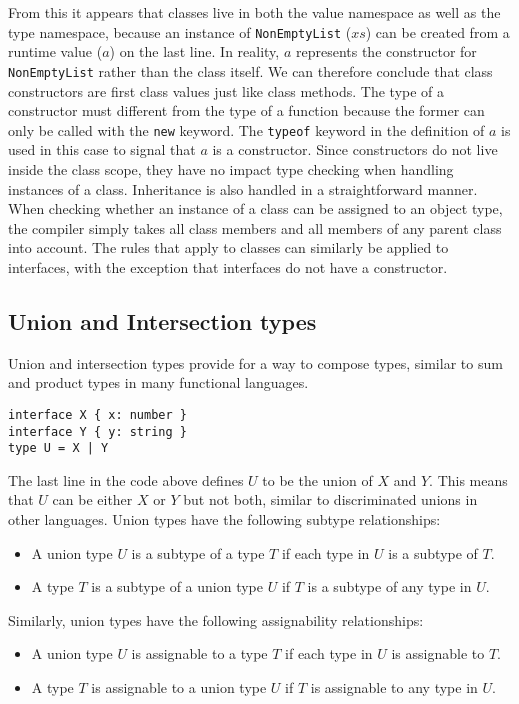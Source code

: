 From this it appears that classes live in both the value namespace as well as the type namespace,
because an instance of \texttt{NonEmptyList} ($xs$) can be created from a runtime value ($a$) on the last line.
In reality, $a$ represents the constructor for \texttt{NonEmptyList} rather than the class itself.
We can therefore conclude that class constructors are first class values just like class methods.
The type of a constructor must different from the type of a function because the former can only be called with the \texttt{new} keyword.
The \texttt{typeof} keyword in the definition of $a$ is used in this case to signal that $a$ is a constructor.
Since constructors do not live inside the class scope, they have no impact type checking when handling instances of a class.
\bigskip
Inheritance is also handled in a straightforward manner.
When checking whether an instance of a class can be assigned to an object type, the compiler
simply takes all class members and all members of any parent class into account.
The rules that apply to classes can similarly be applied to interfaces, with the exception that interfaces do not have a constructor.

\subsection{Union and Intersection types}
Union and intersection types provide for a way to compose types, similar to sum and product types in many functional languages.
\begin{lstlisting}
interface X { x: number }
interface Y { y: string }
type U = X | Y
\end{lstlisting}

The last line in the code above defines $U$ to be the union of $X$ and $Y$. 
This means that $U$ can be either $X$ or $Y$ but not both, similar to discriminated unions in other languages.
Union types have the following subtype relationships:
\begin{itemize}
\item A union type $U$ is a subtype of a type $T$ if each type in $U$ is a subtype of $T$.
\item A type $T$ is a subtype of a union type $U$ if $T$ is a subtype of any type in $U$.
\end{itemize}
Similarly, union types have the following assignability relationships:
\begin{itemize}
\item A union type $U$ is assignable to a type $T$ if each type in $U$ is assignable to $T$.
\item A type $T$ is assignable to a union type $U$ if $T$ is assignable to any type in $U$.
\end{itemize}

